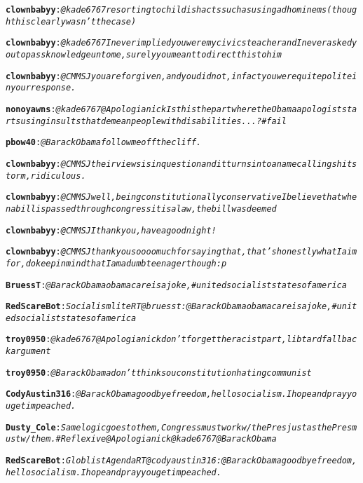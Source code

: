 \begin{alltt}
\textbf{clownbabyy}: \emph{@kade6767 resorting to childish acts such as using ad hominems (though this clearly wasn't the case)}

\textbf{clownbabyy}: \emph{@kade6767 I never implied you were my civics teacher and I never asked you to pass knowledge unto me, surely you meant to direct this to him}

\textbf{clownbabyy}: \emph{@CMMSJ you are forgiven, and you did not, in fact you were quite polite in your response.}

\textbf{nonoyawns}: \emph{@kade6767 @Apologianick Is this the part where the Obama apologist starts using insults that demean people with disabilities...? #fail}

\textbf{pbow40}: \emph{@BarackObama follow me off the cliff.}

\textbf{clownbabyy}: \emph{@CMMSJ their views is in question and it turns into a name calling shitstorm, ridiculous.}

\textbf{clownbabyy}: \emph{@CMMSJ well, being constitutionally conservative I believe that when a bill is passed through congress it is a law, the bill was deemed}

\textbf{clownbabyy}: \emph{@CMMSJ I thank you, have a good night!}

\textbf{clownbabyy}: \emph{@CMMSJ thank you soooo much for saying that, that's honestly what I aim for, do keep in mind that I am a dumb teenager though:p}

\textbf{BruessT}: \emph{@BarackObama obamacare is a joke, #united socialist states of america}

\textbf{RedScareBot}: \emph{Socialism lite RT @bruesst: @BarackObama obamacare is a joke, #united socialist states of america}

\textbf{troy0950}: \emph{@kade6767 @Apologianick don't forget the racist part, libtard fallback argument}

\textbf{troy0950}: \emph{@BarackObama don't think so u constitution hating communist}

\textbf{CodyAustin316}: \emph{@BarackObama goodbye freedom, hello socialism. I hope and pray you get impeached.}

\textbf{Dusty_Cole}: \emph{Same logic goes to them, Congress must work w/the Pres just as the Pres must w/them. #Reflexive @Apologianick @kade6767 @BarackObama}

\textbf{RedScareBot}: \emph{Globlist Agenda RT @codyaustin316: @BarackObama goodbye freedom, hello socialism. I hope and pray you get impeached.}


\end{alltt}
